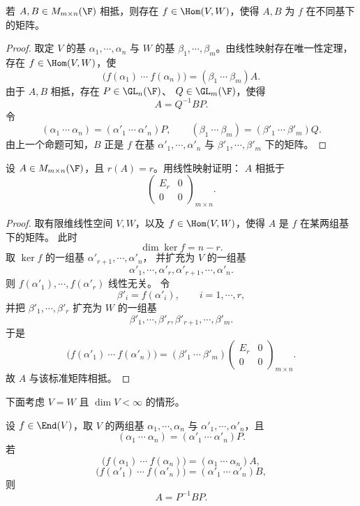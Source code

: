 \begin{proposition}
	若 $A,B\in M_{m\times n}(\F)$ 相抵，则存在
	$f\in\Hom(V,W)$，使得 $A,B$ 为 $f$ 在不同基下的矩阵。
\end{proposition}

\begin{proof}
	取定 $V$ 的基 $\alpha_1,\cdots,\alpha_n$ 与 $W$ 的基
	$\beta_1,\cdots,\beta_m$。由线性映射存在唯一性定理，存在
	$f\in\Hom(V,W)$，使
	\[
	\bigl(f(\alpha_1)\ \cdots\ f(\alpha_n)\bigr)
	=(\beta_1\ \cdots\ \beta_m)A.
	\]
	由于 $A,B$ 相抵，存在 $P\in\GL_n(\F)$、
	$Q\in\GL_m(\F)$，使得
	\[
	A=Q^{-1}BP.
	\]
	令
	\[
	(\alpha_1\ \cdots\ \alpha_n)=(\alpha'_1\ \cdots\ \alpha'_n)P,
	\qquad
	(\beta_1\ \cdots\ \beta_m)=(\beta'_1\ \cdots\ \beta'_m)Q.
	\]
	由上一个命题可知，$B$ 正是 $f$ 在基
	$\alpha'_1,\cdots,\alpha'_n$ 与 $\beta'_1,\cdots,\beta'_m$ 下的矩阵。
\end{proof}

\begin{example}
	设 $A\in M_{m\times n}(\F)$，且 $r(A)=r$。用线性映射证明：
	$A$ 相抵于
	\[
	\begin{pmatrix}
		E_r&0\\
		0&0
	\end{pmatrix}_{m\times n}.
	\]
\end{example}

\begin{proof}
	取有限维线性空间 $V,W$，以及
	$f\in\Hom(V,W)$，使得 $A$ 是 $f$ 在某两组基下的矩阵。
	此时
	\[
	\dim\ker f=n-r.
	\]
	取 $\ker f$ 的一组基 $\alpha'_{r+1},\cdots,\alpha'_n$，
	并扩充为 $V$ 的一组基
	\[
	\alpha'_1,\cdots,\alpha'_r,
	\alpha'_{r+1},\cdots,\alpha'_n.
	\]
	则 $f(\alpha'_1),\cdots,f(\alpha'_r)$ 线性无关。
	令
	\[
	\beta'_i=f(\alpha'_i),
	\qquad i=1,\cdots,r,
	\]
	并把 $\beta'_1,\cdots,\beta'_r$ 扩充为 $W$ 的一组基
	\[
	\beta'_1,\cdots,\beta'_r,
	\beta'_{r+1},\cdots,\beta'_m.
	\]
	于是
	\[
	\bigl(f(\alpha'_1)\ \cdots\ f(\alpha'_n)\bigr)
	=(\beta'_1\ \cdots\ \beta'_m)
	\begin{pmatrix}
		E_r&0\\
		0&0
	\end{pmatrix}_{m\times n}.
	\]
	故 $A$ 与该标准矩阵相抵。
\end{proof}

下面考虑 $V=W$ 且 $\dim V<\infty$ 的情形。

\begin{corollary}
	设 $f\in\End(V)$，取 $V$ 的两组基
	$\alpha_1,\cdots,\alpha_n$ 与 $\alpha'_1,\cdots,\alpha'_n$，且
	\[
	(\alpha_1\ \cdots\ \alpha_n)=(\alpha'_1\ \cdots\ \alpha'_n)P.
	\]
	若
	\[
	\bigl(f(\alpha_1)\ \cdots\ f(\alpha_n)\bigr)
	=(\alpha_1\ \cdots\ \alpha_n)A,
	\]
	\[
	\bigl(f(\alpha'_1)\ \cdots\ f(\alpha'_n)\bigr)
	=(\alpha'_1\ \cdots\ \alpha'_n)B,
	\]
	则
	\[
	A=P^{-1}BP.
	\]
\end{corollary}

